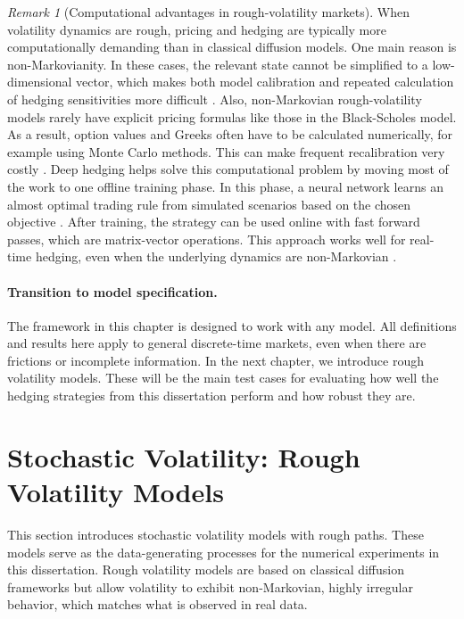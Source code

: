 \documentclass[12pt,a4paper]{article}
\theoremstyle{definition}
\theoremstyle{plain}
\theoremstyle{remark}
\newtheorem{remark}{Remark}[section]
\theoremstyle{plain}
\begin{document}
\begin{remark}[Computational advantages in rough-volatility markets]
\label{rem:computational_adv_rough}
When volatility dynamics are rough, pricing and hedging are typically more computationally demanding than in classical diffusion models. 
One main reason is non-Markovianity. In these cases, the relevant state cannot be simplified to a low-dimensional vector, which makes both model calibration and repeated calculation of hedging sensitivities more difficult \cite{GatheralRough,BayerFriz2016,Horvath2021DeepRough}.
Also, non-Markovian rough-volatility models rarely have explicit pricing formulas like those in the Black-Scholes model. As a result, option values and Greeks often have to be calculated numerically, for example using Monte Carlo methods. This can make frequent recalibration very costly \cite{BayerFriz2016,FrizGatheral2020}.
Deep hedging helps solve this computational problem by moving most of the work to one offline training phase. In this phase, a neural network learns an almost optimal trading rule from simulated scenarios based on the chosen objective \cite{Buehler2019DeepHedging,Horvath2021DeepRough}.
After training, the strategy can be used online with fast forward passes, which are matrix-vector operations. This approach works well for real-time hedging, even when the underlying dynamics are non-Markovian \cite{Buehler2019DeepHedging,Horvath2021DeepRough}.
\end{remark}

\paragraph{Transition to model specification.}
The framework in this chapter is designed to work with any model.
All definitions and results here apply to general discrete-time markets, even when there are frictions or incomplete information.
In the next chapter, we introduce rough volatility models. These will be the main test cases for evaluating how well the hedging strategies from this dissertation perform and how robust they are.

\newpage
\section{Stochastic Volatility: Rough Volatility Models}
\label{sec:rough_volatility}
This section introduces stochastic volatility models with rough paths. These models serve as the data-generating processes for the numerical experiments in this dissertation.
Rough volatility models are based on classical diffusion frameworks but allow volatility to exhibit non-Markovian, highly irregular behavior, which matches what is observed in real data.
\end{document}
